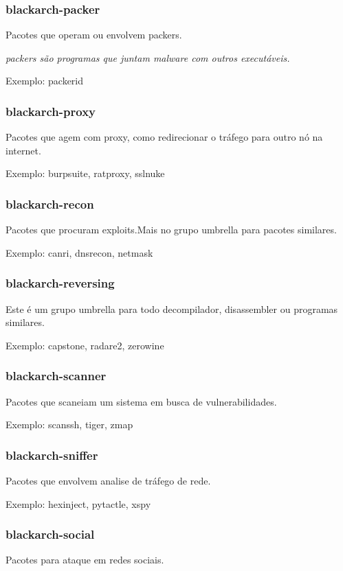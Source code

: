 \documentclass[a4paper, oneside, 11pt]{book}
\begin{document}
\subsubsection{blackarch-packer}
Pacotes que operam ou envolvem packers.

\textit{packers são programas que juntam malware com outros executáveis.}

Exemplo: packerid

\subsubsection{blackarch-proxy}
Pacotes que agem com proxy, como redirecionar o tráfego para outro nó na internet.

Exemplo: burpsuite, ratproxy, sslnuke

\subsubsection{blackarch-recon}
Pacotes que procuram exploits.Mais no grupo umbrella para pacotes similares.

Exemplo: canri, dnsrecon, netmask

\subsubsection{blackarch-reversing}
Este é um grupo umbrella para todo decompilador, disassembler ou programas similares.

Exemplo: capstone, radare2, zerowine

\subsubsection{blackarch-scanner}
Pacotes que scaneiam um sistema em busca de vulnerabilidades.

Exemplo: scanssh, tiger, zmap

\subsubsection{blackarch-sniffer}
Pacotes que envolvem analise de tráfego de rede.

Exemplo: hexinject, pytactle, xspy

\subsubsection{blackarch-social}
Pacotes para ataque em redes sociais.
\end{document}
